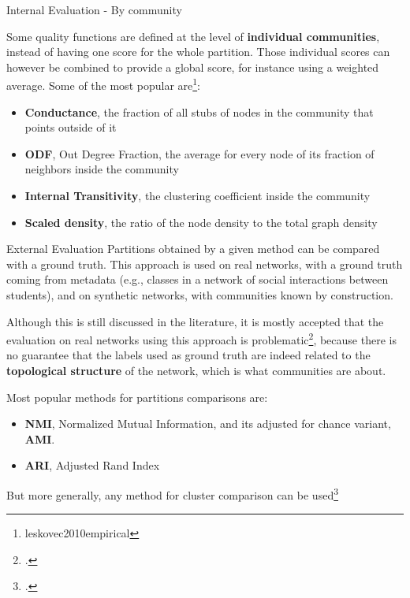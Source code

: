 \documentclass[a4paper,11pt]{book}
\begin{document}
\begin{textbox}{Internal Evaluation - By community}

Some quality functions are defined at the level of \textbf{individual communities}, instead of having one score for the whole partition. Those individual scores can however be combined to provide a global score, for instance using a weighted average. Some of the most popular are\footnote{leskovec2010empirical}:
\begin{itemize}
    \item \textbf{Conductance}, the fraction of all stubs of nodes in the community that points outside of it
    \item \textbf{ODF}, Out Degree Fraction, the average for every node of its fraction of neighbors inside the community
    \item \textbf{Internal Transitivity}, the clustering coefficient inside the community
    \item \textbf{Scaled density}, the ratio of the node density to the total graph density
\end{itemize}


\end{textbox}







\begin{textbox}{External Evaluation}
Partitions obtained by a given method can be compared with a ground truth. This approach is used on real networks, with a ground truth coming from metadata (e.g., classes in a network of social interactions between students), and on synthetic networks, with communities known by construction.

Although this is still discussed in the literature, it is mostly accepted that the evaluation on real networks using this approach is problematic\footcite{peel2017ground}, because there is no guarantee that the labels used as ground truth are indeed related to the \textbf{topological structure} of the network, which is what communities are about.

Most popular methods for partitions comparisons are:
\begin{itemize}
\item \textbf{NMI}, Normalized Mutual Information, and its adjusted for chance variant, \textbf{AMI}.
\item \textbf{ARI}, Adjusted Rand Index
\end{itemize}
But more generally, any method for cluster comparison can be used\footcite{dao2020community}
\end{textbox}
\end{document}
